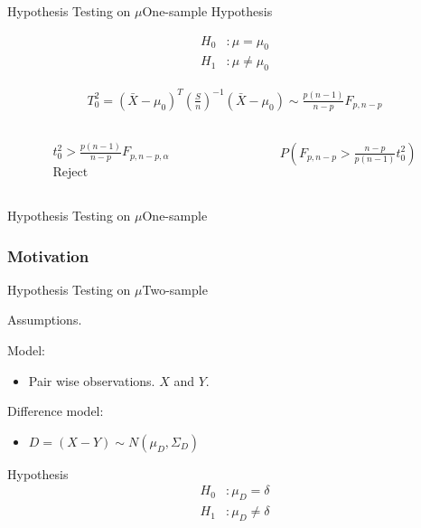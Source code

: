 \documentclass[aspectratio=169,10pt,t]{beamer}
\begin{document}
\begin{frame}{Hypothesis Testing on $\mu$}{One-sample}
	Hypothesis

	\begin{align*}
		H_0&: \mu = \mu_0\\
		H_1&: \mu \neq \mu_0
	\end{align*}

	\begin{align*}
		T^2_0 = ( \bar{X} - \mu_0)^{T} \left(\frac{S}{n}\right)^{-1} ( \bar{X} -\mu_0 ) \sim \frac{p(n-1)}{n-p} F_{p,n-p}
	\end{align*}

	\begin{columns}
		\begin{column}{0.5\textwidth}
			\begin{align*}
				t^2_0 > \frac{p(n-1)}{n-p} F_{p,n-p,\alpha } \\
				\text{Reject}
			\end{align*}
		\end{column}
		\begin{column}{0.5\textwidth}
			\begin{align*}
				P( F_{p,n-p} > \frac{n-p}{p(n-1)} t_0^2 )
			\end{align*}
		\end{column}
	\end{columns}



\end{frame}

\begin{frame}{Hypothesis Testing on $\mu$}{One-sample}
	\vspace{-0.5cm}
	\begin{figure}[H]
		\centering
		\scalebox{0.7}{
		
	}
	\end{figure} 
\end{frame}

\begin{frame}[t]
	\frametitle{Motivation}

\end{frame}

\begin{frame}{Hypothesis Testing on $\mu$}{Two-sample}

	Assumptions.

	Model:
	\begin{itemize}
		\item Pair wise observations. $X$ and $Y$.
	\end{itemize}

	Difference model:
	\begin{itemize}
		\item 
			$ D =   \left( X - Y  \right)  \sim N \left( \mu_D, \Sigma_D  \right)  $
	\end{itemize}

	Hypothesis
	\begin{align*}
		H_0&: \mu_D = \delta\\
		H_1&: \mu_D \neq \delta
	\end{align*}

\end{frame}
\end{document}
